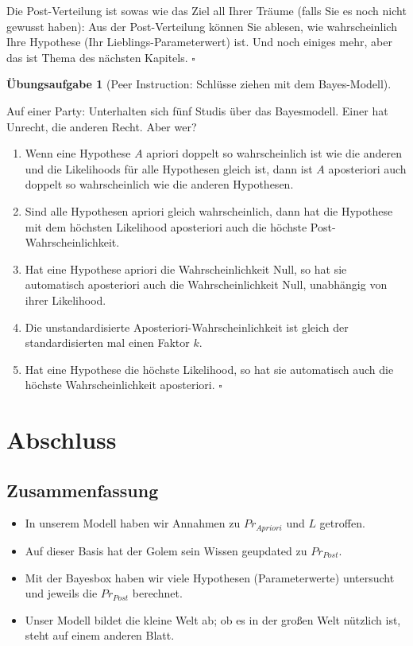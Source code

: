 \documentclass[
  ngerman,
  letterpaper,
  twoside,
  open=any]{scrbook}
\providecommand{\tightlist}{%
  \setlength{\itemsep}{0pt}\setlength{\parskip}{0pt}}\usepackage{longtable,booktabs,array}
\theoremstyle{definition}
\theoremstyle{plain}
\theoremstyle{definition}
\newtheorem{exercise}{Übungsaufgabe}[chapter]
\theoremstyle{definition}
\theoremstyle{definition}
\theoremstyle{definition}
\newtheorem{exercise}{Übungsaufgabe}[chapter]
\theoremstyle{remark}
\begin{document}
Die Post-Verteilung ist sowas wie das Ziel all Ihrer Träume (falls Sie
es noch nicht gewusst haben): Aus der Post-Verteilung können Sie
ablesen, wie wahrscheinlich Ihre Hypothese (Ihr Lieblings-Parameterwert)
ist. Und noch einiges mehr, aber das ist Thema des nächsten Kapitels.
\(\square\)

\begin{exercise}[Peer Instruction: Schlüsse ziehen mit dem
Bayes-Modell]\protect\hypertarget{exr-bayesidee}{}\label{exr-bayesidee}

Auf einer Party: Unterhalten sich fünf Studis über das Bayesmodell.
Einer hat Unrecht, die anderen Recht. Aber wer?

\begin{enumerate}
\def\labelenumi{\Alph{enumi})}
\item
  Wenn eine Hypothese \(A\) apriori doppelt so wahrscheinlich ist wie
  die anderen und die Likelihoods für alle Hypothesen gleich ist, dann
  ist \(A\) aposteriori auch doppelt so wahrscheinlich wie die anderen
  Hypothesen.
\item
  Sind alle Hypothesen apriori gleich wahrscheinlich, dann hat die
  Hypothese mit dem höchsten Likelihood aposteriori auch die höchste
  Post-Wahrscheinlichkeit.
\item
  Hat eine Hypothese apriori die Wahrscheinlichkeit Null, so hat sie
  automatisch aposteriori auch die Wahrscheinlichkeit Null, unabhängig
  von ihrer Likelihood.
\item
  Die unstandardisierte Aposteriori-Wahrscheinlichkeit ist gleich der
  standardisierten mal einen Faktor \(k\).
\item
  Hat eine Hypothese die höchste Likelihood, so hat sie automatisch auch
  die höchste Wahrscheinlichkeit aposteriori. \(\square\)
\end{enumerate}

\end{exercise}

\section{Abschluss}\label{abschluss}

\subsection{Zusammenfassung}\label{zusammenfassung}

\begin{itemize}
\tightlist
\item
  In unserem Modell haben wir Annahmen zu \(Pr_{Apriori}\) und \(L\)
  getroffen.
\item
  Auf dieser Basis hat der Golem sein Wissen geupdated zu \(Pr_{Post}\).
\item
  Mit der Bayesbox haben wir viele Hypothesen (Parameterwerte)
  untersucht und jeweils die \(Pr_{Post}\) berechnet.
\item
  Unser Modell bildet die kleine Welt ab; ob es in der großen Welt
  nützlich ist, steht auf einem anderen Blatt.
\end{itemize}
\end{document}
